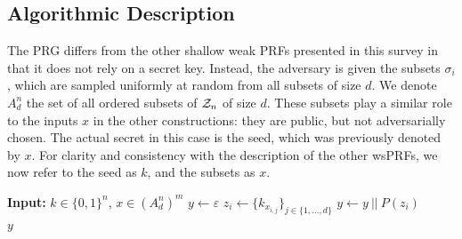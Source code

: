 \subsection{Algorithmic Description}
The PRG differs from the other shallow weak PRFs presented in this survey in that it does not rely on a secret key. Instead, the adversary is given the subsets $\sigma_i$, which are sampled uniformly at random from all subsets of size $d$. We denote $A_d^n$ the set of all ordered subsets of $\mathcal{Z}_n$ of size $d$. These subsets play a similar role to the inputs $x$ in the other constructions: they are public, but not adversarially chosen. The actual secret in this case is the seed, which was previously denoted by $x$. For clarity and consistency with the description of the other wsPRFs, we now refer to the seed as $k$, and the subsets as $x$.


\begin{algorithm}
  \caption{\label{alg:gar}The Goldreich's PRF/PRG \\
    Parameters: $n$ (seed size), $m$ (output size), $d$ (locality) and $P:\{0,1\}^d \to \{0,1\}$ (predicate).}
  \begin{algorithmic}
  \State \textbf{Input:} $k\in\{0,1\}^n$, $x\in (A^n_d)^{m}$
    \State $y \gets \varepsilon$ 
        \State $z_i \gets \{k_{x_{i,j}}\}_{j \in \{1, ..., d\}}$
    	\State $y \gets y~||~P(z_i)$
	\EndFor  \\
    \Return $y$
  \end{algorithmic}
\end{algorithm}




